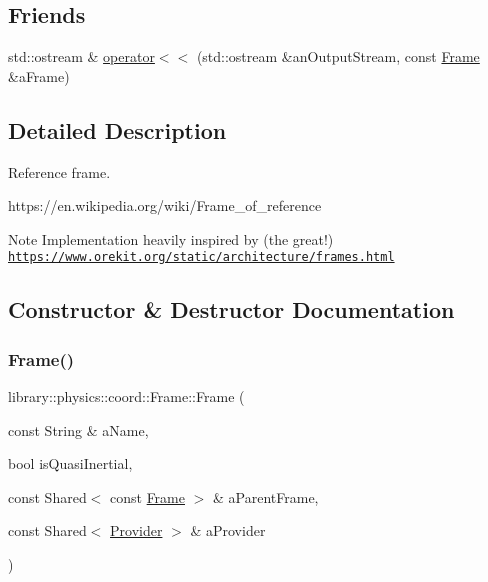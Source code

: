 \subsection*{Friends}
\begin{DoxyCompactItemize}
\item 
std\+::ostream \& \hyperlink{classlibrary_1_1physics_1_1coord_1_1_frame_a509ac1926cfc3553748bace204e2b1cc}{operator$<$$<$} (std\+::ostream \&an\+Output\+Stream, const \hyperlink{classlibrary_1_1physics_1_1coord_1_1_frame}{Frame} \&a\+Frame)
\end{DoxyCompactItemize}


\subsection{Detailed Description}
Reference frame. 

https\+://en.wikipedia.\+org/wiki/\+Frame\+\_\+of\+\_\+reference \begin{DoxyNote}{Note}
Implementation heavily inspired by (the great!) \href{https://www.orekit.org/static/architecture/frames.html}{\tt https\+://www.\+orekit.\+org/static/architecture/frames.\+html} 
\end{DoxyNote}


\subsection{Constructor \& Destructor Documentation}
\mbox{\label{classlibrary_1_1physics_1_1coord_1_1_frame_a53c1f8884a118492a3b024317c0ae0fd}} 
\subsubsection{\texorpdfstring{Frame()}{Frame()}\hspace{0.1cm}{\footnotesize\ttfamily [1/2]}}
{\footnotesize\ttfamily library\+::physics\+::coord\+::\+Frame\+::\+Frame (\begin{DoxyParamCaption}\item[{const String \&}]{a\+Name,  }\item[{bool}]{is\+Quasi\+Inertial,  }\item[{const Shared$<$ const \hyperlink{classlibrary_1_1physics_1_1coord_1_1_frame}{Frame} $>$ \&}]{a\+Parent\+Frame,  }\item[{const Shared$<$ \hyperlink{classlibrary_1_1physics_1_1coord_1_1frame_1_1_provider}{Provider} $>$ \&}]{a\+Provider }\end{DoxyParamCaption})}

